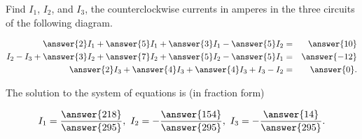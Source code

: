 \documentclass{ximera}
\author{Zack Reed}
\begin{document}
\begin{exercise}

    Find $I_1$, $I_2$, and $I_3$, the counterclockwise currents in
    amperes in the three circuits of the following diagram.
  
    \begin{center}
    \end{center}
  
  
      \begin{eqnarray*}
        \answer{2}I_1 + \answer{5}I_1 + \answer{3}I_1 - \answer{5}I_2 &=& \answer{10} \\
        I_2 - I_3 + \answer{3}I_2 + \answer{7}I_2 + \answer{5}I_2 - \answer{5}I_1 &=& \answer{-12} \\
        \answer{2}I_3 + \answer{4}I_3 + \answer{4}I_3 + I_3 - I_2 &=& \answer{0}.
      \end{eqnarray*}

        The solution to the system of equations is (in fraction form)
  
      \begin{equation*}
        I_1 = \frac{\answer{218}}{\answer{295}},\quad
        I_2 = -\frac{\answer{154}}{\answer{295}},\quad
        I_3 = -\frac{\answer{14}}{\answer{295}}.
      \end{equation*}
  

\end{exercise}
\end{document}
